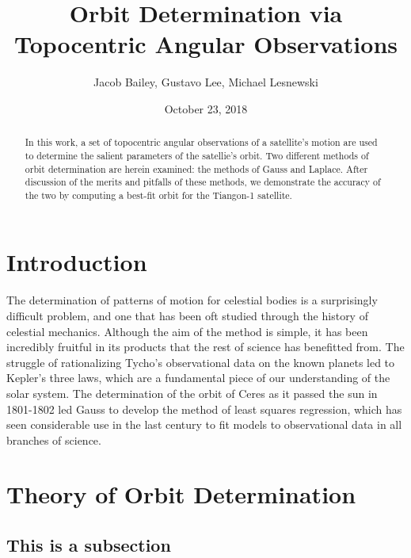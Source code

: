 \documentclass[11pt,twoside,letterpaper]{article}
\begin{document}
\title{Orbit Determination via Topocentric Angular Observations}
\author{Jacob Bailey, Gustavo Lee, Michael Lesnewski}
\date{October 23, 2018}
\maketitle

  \begin{abstract}
    In this work, a set of topocentric angular observations of a
    satellite's motion are used to determine the salient parameters of
    the satellie's orbit. Two different methods of orbit determination
    are herein examined: the methods of Gauss and Laplace. After
    discussion of the merits and pitfalls of these methods, we
    demonstrate the accuracy of the two by computing a best-fit orbit
    for the Tiangon-1 satellite.
  \end{abstract}

  \section {Introduction}
  \paragraph{}
  The determination of patterns of motion for celestial bodies is a
  surprisingly difficult problem, and one that has been oft studied
  through the history of celestial mechanics. Although the aim of the
  method is simple, it has been incredibly fruitful in its products
  that the rest of science has benefitted from. The struggle of
  rationalizing Tycho's observational data on the known planets led to
  Kepler's three laws, which are a fundamental piece of our
  understanding of the solar system. The determination of the orbit of
  Ceres as it passed the sun in 1801-1802 led Gauss to develop the
  method of least squares regression, which has seen considerable use
  in the last century to fit models to observational data in all
  branches of science.

  
  \section{Theory of Orbit Determination}
  
  \subsection {This is a subsection}
    
\end{document}
